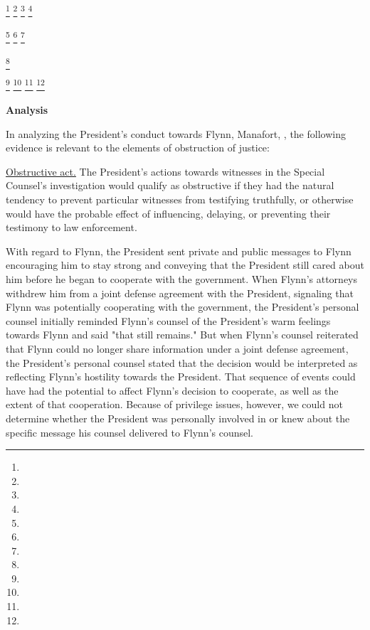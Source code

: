 {

\footnote{}
\footnote{}
\footnote{}
\footnote{}

\footnote{}
\footnote{}
\footnote{}

\footnote{}

\footnote{}
\footnote{}
\footnote{}
\footnote{}

\begin{center}
\textbf{Analysis}
\end{center}

In analyzing the President's conduct towards Flynn, Manafort, , the following evidence is relevant to the elements of obstruction of justice:

\underline{Obstructive act.}
The President's actions towards witnesses in the Special Counsel's investigation would qualify as obstructive if they had the natural tendency to prevent particular witnesses from testifying truthfully, or otherwise would have the probable effect of influencing, delaying, or preventing their testimony to law enforcement.

With regard to Flynn, the President sent private and public messages to Flynn encouraging him to stay strong and conveying that the President still cared about him before he began to cooperate with the government.
When Flynn's attorneys withdrew him from a joint defense agreement with the President, signaling that Flynn was potentially cooperating with the government, the President's personal counsel initially reminded Flynn's counsel of the President's warm feelings towards Flynn and said "that still remains."
But when Flynn's counsel reiterated that Flynn could no longer share information under a joint defense agreement, the President's personal counsel stated that the decision would be interpreted as reflecting Flynn's hostility towards the President.
That sequence of events could have had the potential to affect Flynn's decision to cooperate, as well as the extent of that cooperation.
Because of privilege issues, however, we could not determine whether the President was personally involved in or knew about the specific message his counsel delivered to Flynn's counsel.

}

